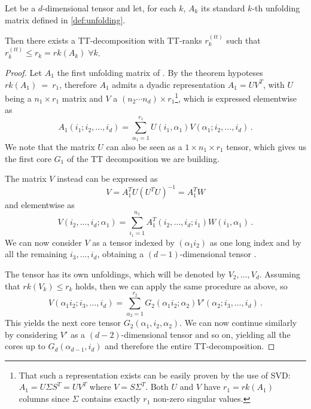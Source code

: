 \begin{Teo} \label{teo:ttsvd}
  Let \A be a $d$-dimensional tensor and let, for each $k$, $A_k$ its standard $k$-th unfolding matrix defined in \ref{def:unfolding}.

  Then there exists a TT-decomposition with TT-ranks $r^{(tt)}_k$ such that $r^{(tt)}_k \leq r_k = rk(A_k) \; \forall k$.

  \begin{proof}
    Let $A_1$ the first unfolding matrix of \A. By the theorem hypoteses $rk(A_1)~=~r_1$, therefore 
    $A_1$ admits a dyadic representation $A_1 = UV^T$, with $U$ being a $n_1 \times r_1$ matrix and $V$ a $(n_2 \cdots n_d) \times r_1$\footnote{That such a representation exists can be easily proven by the use of SVD: $A_1 = U \Sigma S^T = UV^T$ where $V = S \Sigma^T$. Both $U$ and $V$ have $r_1 = rk(A_1)$ columns since $\Sigma$ contains exactly $r_1$ non-zero singular values.},
    which is expressed elementwise as
    \begin{equation*}
      A_1(i_1;i_2,\ldots,i_d) = \sum_{\alpha_1 = 1}^{r_1} U(i_1,\alpha_1) V(\alpha_1;i_2,\ldots,i_d)\, .
    \end{equation*}
    We note that the matrix $U$ can also be seen as a $1 \times n_1 \times r_1$ tensor, which gives us the first core $G_1$ of the TT decomposition we are building.

    The matrix $V$ instead can be expressed as
    \begin{equation}\label{eq:Vdecomp}
      V = A_1^T U (U^T U)^{-1} = A_1^T W
    \end{equation}
    and elementwise as
    \begin{equation*}
      V(i_2,\ldots,i_d;\alpha_1) = \sum_{i_1 = 1}^{n_1} A_1^T(i_2,\ldots,i_d;i_1) W(i_1,\alpha_1)\, .
    \end{equation*}
    We can now consider $V$ as a tensor indexed by $(\alpha_1 i_2)$ as one long index and by all the remaining $i_3, \ldots, i_d$, obtaining a $(d-1)$-dimensional tensor \V.

    The tensor \V has its own unfoldings, which will be denoted by $V_2,\ldots,V_d$. Assuming that $rk(V_k) \leq r_k$ holds, then we can apply the same procedure as above, so
    \begin{equation*}
      V(\alpha_1 i_2;i_3,\ldots,i_d) = \sum_{\alpha_2=1}^{r_2} G_2(\alpha_1 i_2;\alpha_2) V'(\alpha_2;i_3,\ldots,i_d)\, .
    \end{equation*}
    This yields the next core tensor $G_2(\alpha_1,i_2,\alpha_2)$.
    We can now continue similarly by considering $V'$ as a $(d-2)$-dimensional tensor and so on, yielding all the cores up to $G_d(\alpha_{d-1},i_d)$ and therefore the entire TT-decomposition.


\end{proof}
\end{Teo}
